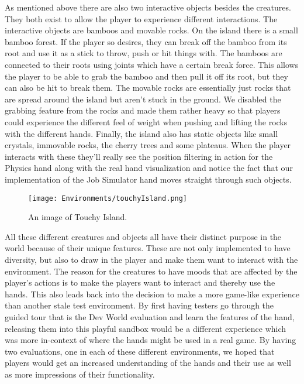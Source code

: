 As mentioned above there are also two interactive objects besides the creatures. They both exist to allow the player to experience different interactions. The interactive objects are bamboos and movable rocks. On the island there is a small bamboo forest. If the player so desires, they can break off the bamboo from its root and use it as a stick to throw, push or hit things with. The bamboos are connected to their roots using joints which have a certain break force. This allows the player to be able to grab the bamboo and then pull it off its root, but they can also be hit to break them. The movable rocks are essentially just rocks that are spread around the island but aren't stuck in the ground. We disabled the grabbing feature from the rocks and made them rather heavy so that players could experience the different feel of weight when pushing and lifting the rocks with the different hands. Finally, the island also has static objects like small crystals, immovable rocks, the cherry trees and some plateaus. When the player interacts with these they'll really see the position filtering in action for the Physics hand along with the real hand visualization and notice the fact that our implementation of the Job Simulator hand moves straight through such objects. 

\begin{figure}[h]
\centering
\texttt{[image: Environments/touchyIsland.png]}
\caption{An image of Touchy Island.}
\label{fig:touchyIsland}
\end{figure}

All these different creatures and objects all have their distinct purpose in the world because of their unique features. These are not only implemented to have diversity, but also to draw in the player and make them want to interact with the environment. The reason for the creatures to have moods that are affected by the player's actions is to make the players want to interact and thereby use the hands. This also leads back into the decision to make a more game-like experience than another stale test environment. By first having testers go through the guided tour that is the Dev World evaluation and learn the features of the hand, releasing them into this playful sandbox would be a different experience which was more in-context of where the hands might be used in a real game. By having two evaluations, one in each of these different environments, we hoped that players would get an increased understanding of the hands and their use as well as more impressions of their functionality. 
